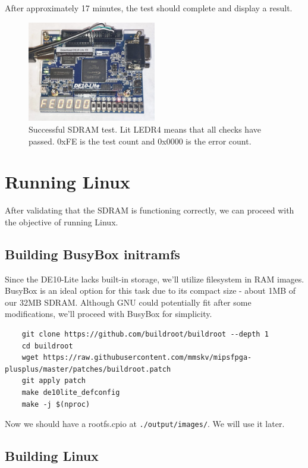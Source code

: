 \documentclass[a4paper]{article}
\let\oldtexttt\texttt
\renewcommand{\texttt}[1]{\textcolor{mygray}{\oldtexttt{#1}}}
\begin{document}
After approximately 17 minutes, the test should complete and display a result.

\begin{figure}[H]
    \centering
    \includegraphics[width=0.5\textwidth]{sdram-test.jpg}
    \captionsetup{width=0.8\textwidth}
    \caption{Successful SDRAM test. Lit LEDR4 means that all checks have passed. 0xFE is the test count and 0x0000 is the error count.}
\end{figure}

\section{Running Linux}

After validating that the SDRAM is functioning correctly, we can proceed with the objective of running Linux.

\subsection{Building BusyBox initramfs}

Since the DE10-Lite lacks built-in storage, we'll utilize filesystem in RAM
images. BusyBox is an ideal option for this task due to its compact size -
about 1MB of our 32MB SDRAM. Although GNU could potentially fit after some
modifications, we'll proceed with BusyBox for simplicity.

\begin{lstlisting}
    git clone https://github.com/buildroot/buildroot --depth 1
    cd buildroot
    wget https://raw.githubusercontent.com/mmskv/mipsfpga-plusplus/master/patches/buildroot.patch
    git apply patch
    make de10lite_defconfig
    make -j $(nproc)
\end{lstlisting}

Now we should have a rootfs.cpio at \texttt{./output/images/}. We will use it later.

\subsection{Building Linux}
\end{document}

